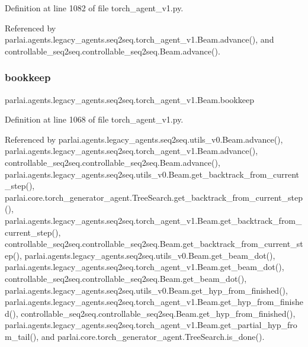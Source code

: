 Definition at line 1082 of file torch\+\_\+agent\+\_\+v1.\+py.



Referenced by parlai.\+agents.\+legacy\+\_\+agents.\+seq2seq.\+torch\+\_\+agent\+\_\+v1.\+Beam.\+advance(), and controllable\+\_\+seq2seq.\+controllable\+\_\+seq2seq.\+Beam.\+advance().

\mbox{\label{classparlai_1_1agents_1_1legacy__agents_1_1seq2seq_1_1torch__agent__v1_1_1Beam_a673dd5c13cababb5d04b5af72a740222}} 
\subsubsection{\texorpdfstring{bookkeep}{bookkeep}}
{\footnotesize\ttfamily parlai.\+agents.\+legacy\+\_\+agents.\+seq2seq.\+torch\+\_\+agent\+\_\+v1.\+Beam.\+bookkeep}



Definition at line 1068 of file torch\+\_\+agent\+\_\+v1.\+py.



Referenced by parlai.\+agents.\+legacy\+\_\+agents.\+seq2seq.\+utils\+\_\+v0.\+Beam.\+advance(), parlai.\+agents.\+legacy\+\_\+agents.\+seq2seq.\+torch\+\_\+agent\+\_\+v1.\+Beam.\+advance(), controllable\+\_\+seq2seq.\+controllable\+\_\+seq2seq.\+Beam.\+advance(), parlai.\+agents.\+legacy\+\_\+agents.\+seq2seq.\+utils\+\_\+v0.\+Beam.\+get\+\_\+backtrack\+\_\+from\+\_\+current\+\_\+step(), parlai.\+core.\+torch\+\_\+generator\+\_\+agent.\+Tree\+Search.\+get\+\_\+backtrack\+\_\+from\+\_\+current\+\_\+step(), parlai.\+agents.\+legacy\+\_\+agents.\+seq2seq.\+torch\+\_\+agent\+\_\+v1.\+Beam.\+get\+\_\+backtrack\+\_\+from\+\_\+current\+\_\+step(), controllable\+\_\+seq2seq.\+controllable\+\_\+seq2seq.\+Beam.\+get\+\_\+backtrack\+\_\+from\+\_\+current\+\_\+step(), parlai.\+agents.\+legacy\+\_\+agents.\+seq2seq.\+utils\+\_\+v0.\+Beam.\+get\+\_\+beam\+\_\+dot(), parlai.\+agents.\+legacy\+\_\+agents.\+seq2seq.\+torch\+\_\+agent\+\_\+v1.\+Beam.\+get\+\_\+beam\+\_\+dot(), controllable\+\_\+seq2seq.\+controllable\+\_\+seq2seq.\+Beam.\+get\+\_\+beam\+\_\+dot(), parlai.\+agents.\+legacy\+\_\+agents.\+seq2seq.\+utils\+\_\+v0.\+Beam.\+get\+\_\+hyp\+\_\+from\+\_\+finished(), parlai.\+agents.\+legacy\+\_\+agents.\+seq2seq.\+torch\+\_\+agent\+\_\+v1.\+Beam.\+get\+\_\+hyp\+\_\+from\+\_\+finished(), controllable\+\_\+seq2seq.\+controllable\+\_\+seq2seq.\+Beam.\+get\+\_\+hyp\+\_\+from\+\_\+finished(), parlai.\+agents.\+legacy\+\_\+agents.\+seq2seq.\+torch\+\_\+agent\+\_\+v1.\+Beam.\+get\+\_\+partial\+\_\+hyp\+\_\+from\+\_\+tail(), and parlai.\+core.\+torch\+\_\+generator\+\_\+agent.\+Tree\+Search.\+is\+\_\+done().

